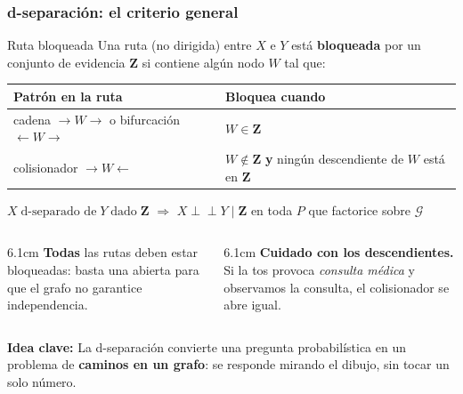 \documentclass[aspectratio=169, 10pt]{beamer}
\newcommand{\indep}{\perp\!\!\!\perp}
\newcommand{\formula}[1]{%
	\begin{tcolorbox}[colback=UCMBlue!8, colframe=UCMBlue, arc=4pt,
		boxsep=2pt, left=6pt, right=6pt, top=3pt, bottom=3pt]
		#1
	\end{tcolorbox}
}
\newcommand{\idea}[1]{%
	\begin{tcolorbox}[colback=AccentGreen!6, colframe=AccentGreen, arc=3pt,
		width=\textwidth, boxsep=1pt, left=5pt, right=5pt, top=2pt, bottom=2pt,
		fontupper=\small]
		\RaggedRight\textbf{Idea clave:} #1
	\end{tcolorbox}
}
\begin{document}
\begin{frame}
\frametitle{d-separación: el criterio general}
\begin{block}{Ruta bloqueada}
Una ruta (no dirigida) entre $X$ e $Y$ está \textbf{bloqueada} por un conjunto de evidencia $\mathbf{Z}$ si contiene algún nodo $W$ tal que:
\end{block}
\vspace{-0.2em}
\begin{center}
\footnotesize
\begin{tabular}{@{}ll@{}}
\toprule
\textbf{Patrón en la ruta} & \textbf{Bloquea cuando} \\
\midrule
cadena \;$\rightarrow W \rightarrow$\; o bifurcación \;$\leftarrow W \rightarrow$\; & $W \in \mathbf{Z}$ \\
colisionador \;$\rightarrow W \leftarrow$\; & $W \notin \mathbf{Z}$ \; \textbf{y} ningún descendiente de $W$ está en $\mathbf{Z}$ \\
\bottomrule
\end{tabular}
\end{center}
\vspace{0.4em}
\formula{\centering
$X \;\text{d-separado de}\; Y \;\text{dado}\; \mathbf{Z}$ \;$\Longrightarrow$\; $X \indep Y \mid \mathbf{Z}$ \; en toda $P$ que factorice sobre $\mathcal{G}$}
\vspace{0.3em}
\begin{columns}[T]
\begin{column}{6.1cm}
\footnotesize
\textbf{Todas} las rutas deben estar bloqueadas: basta una abierta para que el grafo no garantice independencia.
\end{column}
\begin{column}{6.1cm}
\footnotesize
\textbf{Cuidado con los descendientes.} Si la tos provoca \emph{consulta médica} y observamos la consulta, el colisionador se abre igual.
\end{column}
\end{columns}
\vspace{0.1em}
\idea{La d-separación convierte una pregunta probabilística en un problema de \textbf{caminos en un grafo}: se responde mirando el dibujo, sin tocar un solo número.}
\end{frame}
\end{document}
